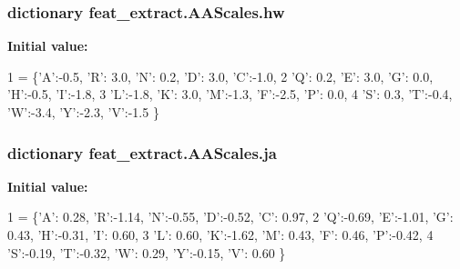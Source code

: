 \subsubsection[{hw}]{\setlength{\rightskip}{0pt plus 5cm}dictionary feat\+\_\+extract.\+A\+A\+Scales.\+hw}\label{namespacefeat__extract_1_1_a_a_scales_a31f47ba59c154bdf8b32811b04d6fd36}
{\bfseries Initial value\+:}
\begin{DoxyCode}
1 = \{\textcolor{stringliteral}{'A'}:-0.5, \textcolor{stringliteral}{'}\textcolor{stringliteral}{R': 3.0, '}N': 0.2, 'D': 3.0, 'C':-1.0,
2       \textcolor{stringliteral}{'Q'}: 0.2, \textcolor{stringliteral}{'E'}: 3.0, \textcolor{stringliteral}{'G'}: 0.0, \textcolor{stringliteral}{'H'}:-0.5, \textcolor{stringliteral}{'I'}:-1.8,
3       \textcolor{stringliteral}{'L'}:-1.8, \textcolor{stringliteral}{'K'}: 3.0, \textcolor{stringliteral}{'M'}:-1.3, \textcolor{stringliteral}{'F'}:-2.5, \textcolor{stringliteral}{'P'}: 0.0,
4       \textcolor{stringliteral}{'S'}: 0.3, \textcolor{stringliteral}{'T'}:-0.4, \textcolor{stringliteral}{'W'}:-3.4, \textcolor{stringliteral}{'Y'}:-2.3, \textcolor{stringliteral}{'V'}:-1.5 \}
\end{DoxyCode}
\hypertarget{namespacefeat__extract_1_1_a_a_scales_acabeaf69a2a58e736b69904b48da4fba}{}
\subsubsection[{ja}]{\setlength{\rightskip}{0pt plus 5cm}dictionary feat\+\_\+extract.\+A\+A\+Scales.\+ja}\label{namespacefeat__extract_1_1_a_a_scales_acabeaf69a2a58e736b69904b48da4fba}
{\bfseries Initial value\+:}
\begin{DoxyCode}
1 = \{\textcolor{stringliteral}{'A'}: 0.28, \textcolor{stringliteral}{'}\textcolor{stringliteral}{R':-1.14, '}N':-0.55, 'D':-0.52, 'C': 0.97,
2       \textcolor{stringliteral}{'Q'}:-0.69, \textcolor{stringliteral}{'E'}:-1.01, \textcolor{stringliteral}{'G'}: 0.43, \textcolor{stringliteral}{'H'}:-0.31, \textcolor{stringliteral}{'I'}: 0.60,
3       \textcolor{stringliteral}{'L'}: 0.60, \textcolor{stringliteral}{'K'}:-1.62, \textcolor{stringliteral}{'M'}: 0.43, \textcolor{stringliteral}{'F'}: 0.46, \textcolor{stringliteral}{'P'}:-0.42,
4       \textcolor{stringliteral}{'S'}:-0.19, \textcolor{stringliteral}{'T'}:-0.32, \textcolor{stringliteral}{'W'}: 0.29, \textcolor{stringliteral}{'Y'}:-0.15, \textcolor{stringliteral}{'V'}: 0.60 \}
\end{DoxyCode}
\hypertarget{namespacefeat__extract_1_1_a_a_scales_a3b23fb49b090bb6dedcc1fc54d1faf12}{}
